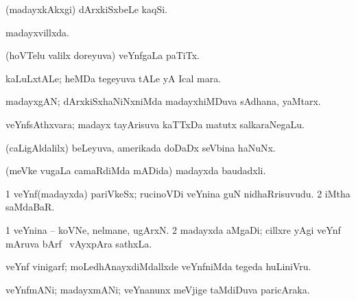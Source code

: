 {{{{{{\bentry
{}
  \gl{\nA}\bmng
(madayxkAkxgi) dArxkiSxbeLe kaqSi. 
\emng
\eentry

\bentry
{}
  \gl{\gu}\bmng
madayxvillxda. 
\emng
\eentry

\bentry
{}
 \gl{\nA}\bmng
(hoVTelu \mo valilx doreyuva) veYnfgaLa paTiTx. 
\emng
\eentry

\bentry
{}
  \gl{\nA}\bmng
kaLuLxtALe; heMDa tegeyuva tALe yA Ical mara. 
\emng
\eentry

\bentry
{}
  \gl{\nA}\bmng
madayxgAN; dArxkiSxhaNiNxniMda madayxhiMDuva sAdhana, yaMtarx. 
\emng
\eentry

\bentry
{}
  \gl{\nA}\bmng
veYnfsAthxvara; madayx tayArisuva kaTTxDa matutx salkaraNegaLu. 
\emng
\eentry

\bentry
{}
  \gl{\nA}\bmng
(caLigAldalilx) beLeyuva, amerikada doDaDx seVbina haNuNx. 
\emng
\eentry

\bentry
{}
  \gl{\nA}\bmng
(meVke \mo vugaLa camaRdiMda mADida) madayxda baudadxli. 
\emng
\eentry

\bentry
{}
  \gl{\nA}\bmng
{} 
\emng
\eentry

\bentry
{}
  \gl{\nA}\bmng
\bnum
\num{1} veYnf(madayxda) pariVkeSx; rucinoVDi veYnina guN nidhaRrisuvudu. 
\num{2} iMtha saMdaBaR. 
\enum
\emng
\eentry

\bentry
{}
  \gl{\nA}\bmng
\bnum
\num{1} veYnina -- koVNe, nelmane, ugArxN. 
\num{2} madayxda aMgaDi; cillxre yAgi veYnf mAruva bArf \mo\ vAyxpAra sathxLa. 
\enum
\emng
\eentry

\bentry
{}
 \gl{\nA}\bmng
veYnf vinigarf; moLedhAnayxdiMdallxde veYnfniMda tegeda huLiniVru. 
\emng
\eentry

\bentry
{}
 \gl{\nA}\bmng
veYnfmANi; madayxmANi; veYnanunx meVjige taMdiDuva paricAraka. 
\emng
\eentry

}}}}}}
